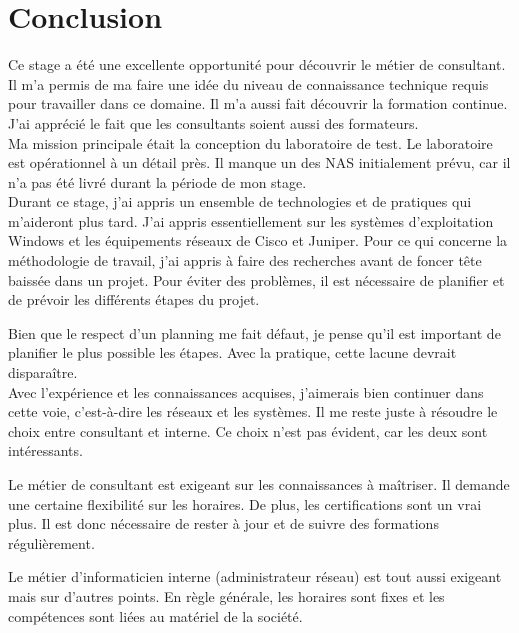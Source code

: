 \chapter*{Conclusion}
Ce stage a été une excellente opportunité pour découvrir le métier de consultant.
Il m'a permis de ma faire une idée du niveau de connaissance technique requis pour travailler dans ce domaine.
Il m'a aussi fait découvrir la formation continue.
J'ai apprécié le fait que les consultants soient aussi des formateurs.\\

Ma mission principale était la conception du laboratoire de test.
Le laboratoire est opérationnel à un détail près.
Il manque un des NAS initialement prévu, car il n'a pas été livré durant la période de mon stage. \\

Durant ce stage, j'ai appris un ensemble de technologies et de pratiques qui m'aideront plus tard.
J'ai appris essentiellement sur les systèmes d'exploitation Windows et les équipements réseaux de Cisco et Juniper. 
Pour ce qui concerne la méthodologie de travail, j'ai appris à faire des recherches avant de foncer tête baissée dans un projet.
Pour éviter des problèmes, il est nécessaire de planifier et de prévoir les différents étapes du projet.

Bien que le respect d'un planning me fait défaut, je pense qu'il est important de planifier le plus possible les étapes. 
Avec la pratique, cette lacune devrait disparaître.\\

Avec l'expérience et les connaissances acquises, j'aimerais bien continuer dans cette voie, c'est-à-dire les réseaux et les systèmes.
Il me reste juste à résoudre le choix entre consultant et interne.
Ce choix n'est pas évident, car les deux sont intéressants.

Le métier de consultant est exigeant sur les connaissances à maîtriser.
Il demande une certaine flexibilité sur les horaires.
De plus, les certifications sont un vrai plus.
Il est donc nécessaire de rester à jour et de suivre des formations régulièrement.

Le métier d'informaticien interne (administrateur réseau) est tout aussi exigeant mais sur d'autres points.
En règle générale, les horaires sont fixes et les compétences sont liées au matériel de la société.